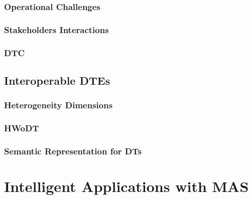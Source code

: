 \documentclass[12pt,a4paper,openright,twoside]{book}
\begin{document}
\section{Operational Challenges}

\section{Stakeholders Interactions}

\section{\acl{DTC}}


\chapter{Interoperable \aclp{DTE}}
\label{chap:digital-twin-ecosystem}

\section{Heterogeneity Dimensions}

\section{\acl{HWoDT}}

\section{Semantic Representation for \aclp{DT}}


\part{Intelligent Applications with \acl{MAS}}
\end{document}
